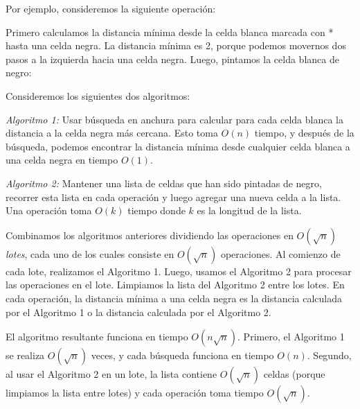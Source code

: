 Por ejemplo, consideremos la siguiente operación:

\begin{center}
\end{center}

Primero calculamos la distancia mínima
desde la celda blanca marcada con * hasta una celda negra.
La distancia mínima es 2, porque podemos movernos
dos pasos a la izquierda hacia una celda negra.
Luego, pintamos la celda blanca de negro:

\begin{center}
\end{center}

Consideremos los siguientes dos algoritmos:

\emph{Algoritmo 1:} Usar búsqueda en anchura
para calcular para cada celda blanca la distancia a la celda negra más cercana.
Esto toma $O(n)$ tiempo, y después de la búsqueda,
podemos encontrar la distancia mínima desde cualquier celda blanca
a una celda negra en tiempo $O(1)$.

\emph{Algoritmo 2:} Mantener una lista de celdas que han sido
pintadas de negro, recorrer esta lista en cada operación
y luego agregar una nueva celda a la lista.
Una operación toma $O(k)$ tiempo donde $k$ es la longitud de la lista.

Combinamos los algoritmos anteriores dividiendo las operaciones en
$O(\sqrt n)$ \emph{lotes}, cada uno de los cuales consiste
en $O(\sqrt n)$ operaciones.
Al comienzo de cada lote,
realizamos el Algoritmo 1.
Luego, usamos el Algoritmo 2 para procesar las operaciones
en el lote.
Limpiamos la lista del Algoritmo 2 entre
los lotes.
En cada operación,
la distancia mínima a una celda negra
es la distancia calculada por el Algoritmo 1
o la distancia calculada por el Algoritmo 2.

El algoritmo resultante funciona en
tiempo $O(n \sqrt n)$.
Primero, el Algoritmo 1 se realiza $O(\sqrt n)$ veces,
y cada búsqueda funciona en tiempo $O(n)$.
Segundo, al usar el Algoritmo 2 en un lote,
la lista contiene $O(\sqrt n)$ celdas
(porque limpiamos la lista entre lotes)
y cada operación toma tiempo $O(\sqrt n)$.

